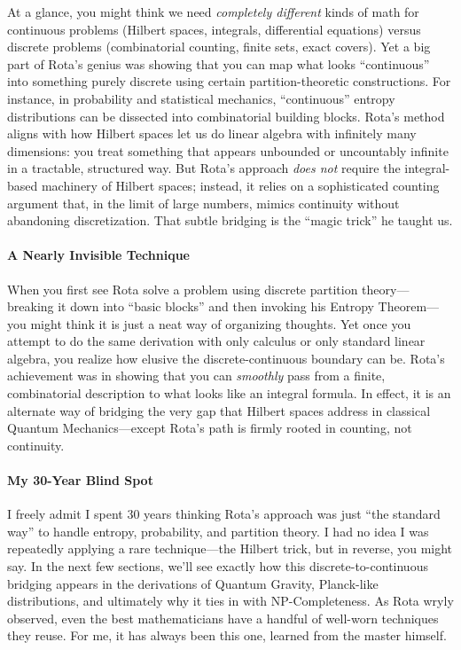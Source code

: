 \documentclass{report}
\begin{document}
At a glance, you might think we need \emph{completely different} kinds of math for continuous 
problems (Hilbert spaces, integrals, differential equations) versus discrete problems (combinatorial 
counting, finite sets, exact covers). Yet a big part of Rota's genius was showing that you can map 
what looks ``continuous'' into something purely discrete using certain partition-theoretic 
constructions. For instance, in probability and statistical mechanics, ``continuous'' entropy 
distributions can be dissected into combinatorial building blocks. Rota's method aligns with how 
Hilbert spaces let us do linear algebra with infinitely many dimensions: you treat something that 
appears unbounded or uncountably infinite in a tractable, structured way. But Rota's approach 
\emph{does not} require the integral-based machinery of Hilbert spaces; instead, it relies on a 
sophisticated counting argument that, in the limit of large numbers, mimics continuity without 
abandoning discretization. That subtle bridging is the ``magic trick'' he taught us.

\paragraph*{A Nearly Invisible Technique}
When you first see Rota solve a problem using discrete partition theory—breaking it down into 
``basic blocks'' and then invoking his Entropy Theorem—you might think it is just a neat way of 
organizing thoughts. Yet once you attempt to do the same derivation with only calculus or only 
standard linear algebra, you realize how elusive the discrete-continuous boundary can be. Rota's 
achievement was in showing that you can \emph{smoothly} pass from a finite, combinatorial 
description to what looks like an integral formula. In effect, it is an alternate way of bridging 
the very gap that Hilbert spaces address in classical Quantum Mechanics—except Rota's path is 
firmly rooted in counting, not continuity.

\paragraph*{My 30-Year Blind Spot}
I freely admit I spent 30 years thinking Rota's approach was just ``the standard way'' to handle 
entropy, probability, and partition theory. I had no idea I was repeatedly applying a rare 
technique—the Hilbert trick, but in reverse, you might say. In the next few sections, we'll see 
exactly how this discrete-to-continuous bridging appears in the derivations of Quantum Gravity, 
Planck-like distributions, and ultimately why it ties in with NP-Completeness. As Rota wryly 
observed, even the best mathematicians have a handful of well-worn techniques they reuse. For me, 
it has always been this one, learned from the master himself.
\end{document}
